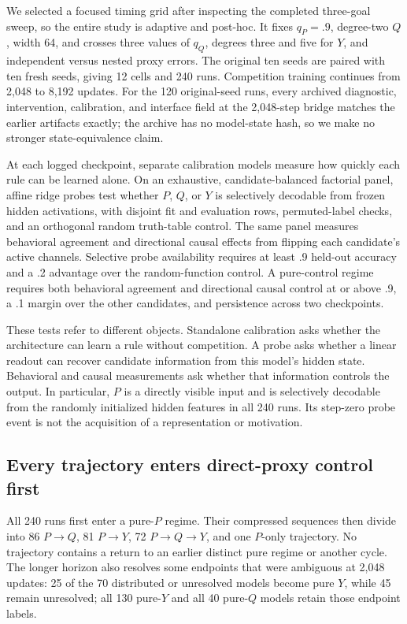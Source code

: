 \documentclass[11pt,a4paper]{article}
\begin{document}
We selected a focused timing grid after inspecting the completed three-goal sweep, so the entire study is adaptive and post-hoc. It fixes $q_P=.9$, degree-two $Q$, width 64, and crosses three values of $q_Q$, degrees three and five for $Y$, and independent versus nested proxy errors. The original ten seeds are paired with ten fresh seeds, giving 12 cells and 240 runs. Competition training continues from 2,048 to 8,192 updates. For the 120 original-seed runs, every archived diagnostic, intervention, calibration, and interface field at the 2,048-step bridge matches the earlier artifacts exactly; the archive has no model-state hash, so we make no stronger state-equivalence claim.

At each logged checkpoint, separate calibration models measure how quickly each rule can be learned alone. On an exhaustive, candidate-balanced factorial panel, affine ridge probes test whether $P$, $Q$, or $Y$ is selectively decodable from frozen hidden activations, with disjoint fit and evaluation rows, permuted-label checks, and an orthogonal random truth-table control. The same panel measures behavioral agreement and directional causal effects from flipping each candidate's active channels. Selective probe availability requires at least .9 held-out accuracy and a .2 advantage over the random-function control. A pure-control regime requires both behavioral agreement and directional causal control at or above .9, a .1 margin over the other candidates, and persistence across two checkpoints.

These tests refer to different objects. Standalone calibration asks whether the architecture can learn a rule without competition. A probe asks whether a linear readout can recover candidate information from this model's hidden state. Behavioral and causal measurements ask whether that information controls the output. In particular, $P$ is a directly visible input and is selectively decodable from the randomly initialized hidden features in all 240 runs. Its step-zero probe event is not the acquisition of a representation or motivation.

\subsection*{Every trajectory enters direct-proxy control first}

All 240 runs first enter a pure-$P$ regime. Their compressed sequences then divide into 86 $P\mathbin{\to}Q$, 81 $P\mathbin{\to}Y$, 72 $P\mathbin{\to}Q\mathbin{\to}Y$, and one $P$-only trajectory. No trajectory contains a return to an earlier distinct pure regime or another cycle. The longer horizon also resolves some endpoints that were ambiguous at 2,048 updates: 25 of the 70 distributed or unresolved models become pure $Y$, while 45 remain unresolved; all 130 pure-$Y$ and all 40 pure-$Q$ models retain those endpoint labels.
\end{document}
